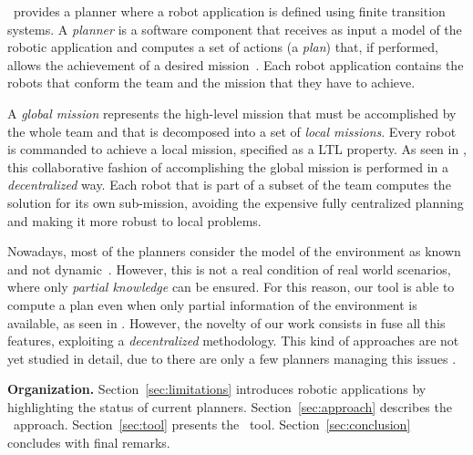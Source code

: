 

\toolName\ provides a planner where a robot application is defined using finite transition systems.
A \emph{planner} is  a software component that receives as input a model of the robotic application and computes  a set of actions (a \emph{plan}) that, if performed, allows the achievement of a desired mission~\cite{latombe2012robot}.
Each robot application contains the robots that conform the team and the mission that they have to achieve.

A \emph{global mission} represents the high-level mission that must be accomplished by the whole team \cite{kloetzer2011multi,loizou2005automated,quottrup2004multi} and that is decomposed into a set of \emph{local missions}\cite{schillinger2016decomposition,guo2015multi,guo2015multi,tumova2016multi}.
Every robot is commanded to achieve a local mission, specified as a LTL property.
As seen in \cite{tumova2016multi}, this collaborative fashion of accomplishing the global mission is performed in a \emph{decentralized} way.
Each robot that is part of a subset of the team computes the solution for its own sub-mission, avoiding the expensive fully centralized planning and making it more robust to local problems.

Nowadays, most of the planners consider the model of the environment as known and not dynamic~\cite{7139412}. 
However, this is not a real condition of real world scenarios, where only \emph{partial knowledge} can be ensured.
For this reason, our tool is able to compute a plan even when only partial information of the environment is available, as seen in \cite{roy2006planning,du2012robot,diaz2001exploring}.
However, the novelty of our work consists in fuse all this features, exploiting a \emph{decentralized} methodology.
This kind of approaches are not yet studied in detail, due to there are only a few planners managing this issues \cite{guo2015multi}.


\textbf{Organization.} 
Section~\ref{sec:limitations} introduces robotic applications by highlighting the status of current planners.
Section~\ref{sec:approach} describes the \toolName\ approach.
Section~\ref{sec:tool} presents the \toolName\ tool.
Section~\ref{sec:conclusion} concludes with final remarks.

